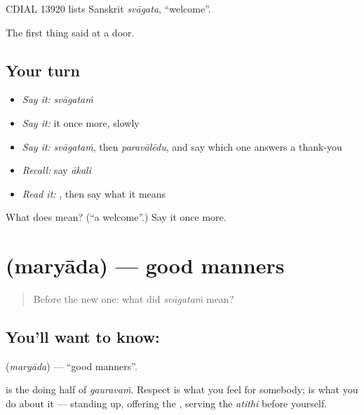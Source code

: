 CDIAL 13920 lists Sanskrit \emph{svāgata}, \textquotedblleft{}welcome\textquotedblright{}.

\begin{grammarlens}[title={What you've built}]
The first thing said at a door.
\end{grammarlens}

\subsection*{Your turn}
\begin{itemize}
\raggedright
  \item \emph{Say it:} \emph{svāgataṁ}
  \item \emph{Say it:} it once more, slowly
  \item \emph{Say it:} \emph{svāgataṁ}, then \emph{paravālēdu}, and say which one answers a thank-you
  \item \emph{Recall:} say \emph{ākali}
  \item \emph{Read it:} \textbf{}, then say what it means
\end{itemize}

\begin{tcolorbox}[breakable,colback=teal!4,colframe=teal!35!black,title={Before you move on}]
What does  mean? (\textquotedblleft{}a welcome\textquotedblright{}.) Say it once more.
\end{tcolorbox}
\section[\texorpdfstring{\te{మర్యాద} (maryāda)}{మర్యాద (maryāda)}]{ (maryāda) — good manners}

\label{lesson:TE-C65-manners}



\begin{quote}
Before the new one: what did \emph{svāgataṁ} mean?
\end{quote}

\subsection*{You'll want to know: }
\textbf{} (\emph{maryāda}) — \textquotedblleft{}good manners\textquotedblright{}.

 is the doing half of \emph{gauravaṁ}. Respect is what you feel for somebody;  is what you do about it — standing up, offering the , serving the \emph{atithi} before yourself.

